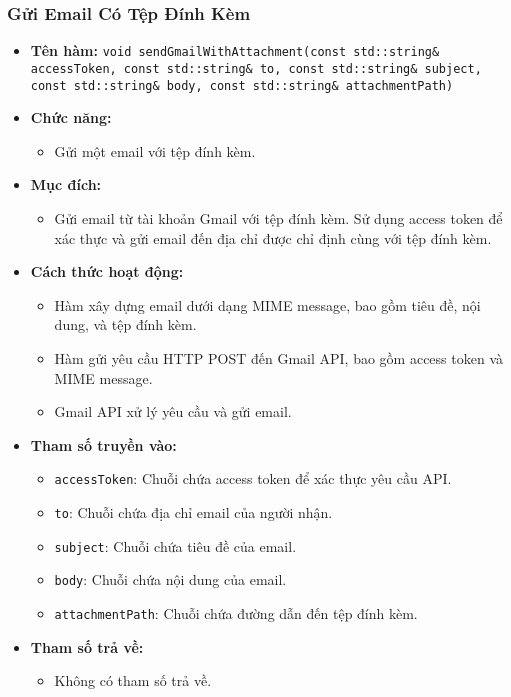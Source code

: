 \subsubsection{Gửi Email Có Tệp Đính Kèm}
\begin{itemize}
    \item \textbf{Tên hàm:} \texttt{void sendGmailWithAttachment(const std::string\& accessToken, const std::string\& to, const std::string\& subject, const std::string\& body, const std::string\& attachmentPath)}
    \item \textbf{Chức năng:} 
    \begin{itemize}
        \item Gửi một email với tệp đính kèm.
    \end{itemize}
    \item \textbf{Mục đích:} 
    \begin{itemize}
        \item Gửi email từ tài khoản Gmail với tệp đính kèm. Sử dụng access token để xác thực và gửi email đến địa chỉ được chỉ định cùng với tệp đính kèm.
    \end{itemize}
    \item \textbf{Cách thức hoạt động:} 
    \begin{itemize}
        \item Hàm xây dựng email dưới dạng MIME message, bao gồm tiêu đề, nội dung, và tệp đính kèm.
        \item Hàm gửi yêu cầu HTTP POST đến Gmail API, bao gồm access token và MIME message.
        \item Gmail API xử lý yêu cầu và gửi email.
    \end{itemize}
    \item \textbf{Tham số truyền vào:} 
    \begin{itemize}
        \item \texttt{accessToken}: Chuỗi chứa access token để xác thực yêu cầu API.
        \item \texttt{to}: Chuỗi chứa địa chỉ email của người nhận.
        \item \texttt{subject}: Chuỗi chứa tiêu đề của email.
        \item \texttt{body}: Chuỗi chứa nội dung của email.
        \item \texttt{attachmentPath}: Chuỗi chứa đường dẫn đến tệp đính kèm.
    \end{itemize}
    \item \textbf{Tham số trả về:} 
    \begin{itemize}
        \item Không có tham số trả về.
    \end{itemize}
\end{itemize}

